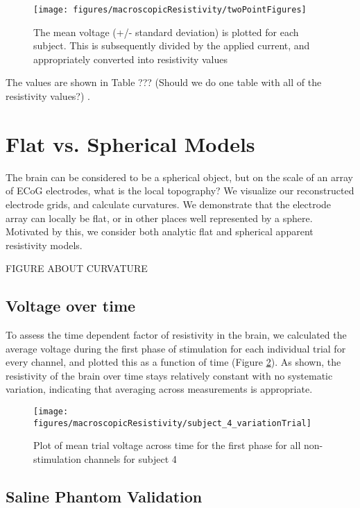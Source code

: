 \begin{figure}[ht]
	\centering
	\texttt{[image: figures/macroscopicResistivity/twoPointFigures]}
	\caption[Two-point results]{The mean voltage (+/- standard deviation) is plotted for each subject. This is subsequently divided by the applied current, and appropriately converted into resistivity values}
	\label{fig:twoPointFigures}
\end{figure}

The values are shown in Table ??? (Should we do one table with all of the resistivity values?) .

\section{Flat vs. Spherical Models}
The brain can be considered to be a spherical object, but on the scale of an array of ECoG electrodes, what is the local topography? We visualize our reconstructed electrode grids, and calculate curvatures. We demonstrate that the electrode array can locally be flat, or in other places well represented by a sphere. Motivated by this, we consider both analytic flat and spherical apparent resistivity models. 

FIGURE ABOUT CURVATURE

\subsection{Voltage over time}
To assess the time dependent factor of resistivity in the brain, we calculated the average voltage during the first phase of stimulation for each individual trial for every channel, and plotted this as a function of time (Figure \ref{fig:mrVoltageOverTime}). As shown, the resistivity of the brain over time stays relatively constant with no systematic variation, indicating that averaging across measurements is appropriate. 

\begin{figure}[ht]
	\centering
	\texttt{[image: figures/macroscopicResistivity/subject\_4\_variationTrial]}
	\caption[Recorded voltage over time]{Plot of mean trial voltage across time for the first phase for all non-stimulation channels for subject 4}
	\label{fig:mrVoltageOverTime}
\end{figure}

\subsection{Saline Phantom Validation}

